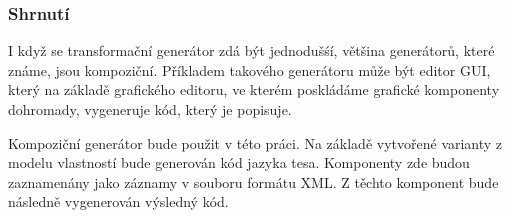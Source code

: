 \subsubsection{Shrnutí}
I když se transformační generátor zdá být jednodušśí, většina generátorů, které známe, jsou kompoziční. Příkladem takového generátoru může být editor GUI, který na základě grafického editoru, ve kterém poskládáme grafické komponenty dohromady, vygeneruje kód, který je popisuje.

Kompoziční generátor bude použit v této práci. Na základě vytvořené varianty z modelu vlastností bude generován kód jazyka tesa. Komponenty zde budou zaznamenány jako záznamy v souboru formátu XML. Z těchto komponent bude následně vygenerován výsledný kód.